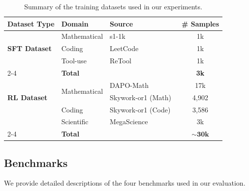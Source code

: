 \begin{table}[!t]
\centering
\caption{
Summary of the training datasets used in our experiments.
}
\small
\setlength{\tabcolsep}{6pt}
\renewcommand{\arraystretch}{1.15}
\begin{tabular}{l l l c}
\toprule
\textbf{Dataset Type} & \textbf{Domain} & \textbf{Source} & \textbf{\# Samples} \\
\midrule

\multirow{3}{*}{\textbf{SFT Dataset}}
& Mathematical %
& s1-1k~\citep{muennighoff2025s1} 
& 1k \\

& Coding 
& LeetCode~\citep{xia2025leetcodedataset}
& 1k \\

& Tool-use %
& ReTool~\citep{feng2025retool} 
& 1k \\

\cmidrule(lr){2-4}
& \multicolumn{2}{l}{\textbf{Total}} 
& \textbf{3k} \\

\midrule

\multirow{3}{*}{\textbf{RL Dataset}}
& \multirow{2}{*}{Mathematical %
}
& DAPO-Math~\citep{yu2025dapo} 
& 17k \\

& 
& Skywork-or1 (Math)~\citep{he2025skywork-or1} 
& 4,902 \\

& Coding 
& Skywork-or1 (Code)~\citep{he2025skywork-or1} 
& 3,586 \\

& Scientific %
& MegaScience~\citep{fan2025megascience} 
& 3k \\

\cmidrule(lr){2-4}
& \multicolumn{2}{l}{\textbf{Total}} 
& $\sim \textbf{30k}$ \\


\bottomrule
\end{tabular}
\label{tab:training_datasets}
\end{table}










\subsection{Benchmarks}
\label{app:benchmarks}
We provide detailed descriptions of the four benchmarks used in our evaluation.

